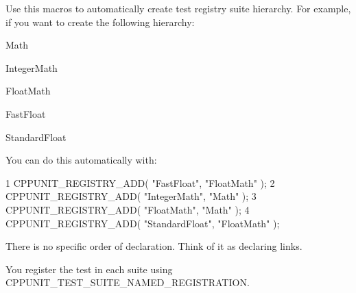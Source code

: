 Use this macros to automatically create test registry suite hierarchy. For example, if you want to create the following hierarchy\+:
\begin{DoxyItemize}
\item Math
\begin{DoxyItemize}
\item Integer\+Math
\item Float\+Math
\begin{DoxyItemize}
\item Fast\+Float
\item Standard\+Float
\end{DoxyItemize}
\end{DoxyItemize}
\end{DoxyItemize}

You can do this automatically with\+: 
\begin{DoxyCode}
1 CPPUNIT\_REGISTRY\_ADD( "FastFloat", "FloatMath" );
2 CPPUNIT\_REGISTRY\_ADD( "IntegerMath", "Math" );
3 CPPUNIT\_REGISTRY\_ADD( "FloatMath", "Math" );
4 CPPUNIT\_REGISTRY\_ADD( "StandardFloat", "FloatMath" );
\end{DoxyCode}


There is no specific order of declaration. Think of it as declaring links.

You register the test in each suite using C\+P\+P\+U\+N\+I\+T\+\_\+\+T\+E\+S\+T\+\_\+\+S\+U\+I\+T\+E\+\_\+\+N\+A\+M\+E\+D\+\_\+\+R\+E\+G\+I\+S\+T\+R\+A\+T\+I\+O\+N.


